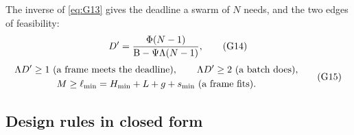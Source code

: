 \documentclass[11pt,a4paper]{article}
\newif\iffull
\begin{document}
\iffull
\textbf{Derivation of \eqref{eq:G10}--\eqref{eq:G13}.} \eqref{eq:G3} with $\nu=(N-1)\Lam/b$ gives
\eqref{eq:G10}. Dividing numerator and denominator by $\Psi$ gives \eqref{eq:G11}. At $b=1$,
$\Nmax(1)-1=\Ninf/(1+\beta)$, and the ratio is \eqref{eq:G12}; $\Gain<b$ because $b+\beta>1+\beta$
for $b>1$, and $\Gain<1+\beta$ because $b/(b+\beta)<1$. Inserting $b=\Lam\Dnet$ (ignoring the integer
rounding) in \eqref{eq:G10} gives \eqref{eq:G13}. For the channel, \eqref{eq:G9} is \eqref{eq:G3}
with $\Bud=\rhostar/\kappa$ and $\tauhat=\tauzero/\kappa-\delta$. \textit{Source:} derived in this
project.
\fi

The inverse of \eqref{eq:G13} gives the deadline a swarm of $N$ needs, and the two edges of
feasibility:
\begin{equation}
D'=\frac{\Phi(N-1)}{\mathrm{B}-\Psi\Lambda(N-1)}, \tag{G14}\label{eq:G14}
\end{equation}
\begin{equation}
\begin{gathered}
\Lam\Dnet\ge1\ \text{(a frame meets the deadline)},\qquad \Lam\Dnet\ge2\ \text{(a batch does)},\\
M\ge\ell_{\min}=H_{\min}+L+g+s_{\min}\ \text{(a frame fits)}.
\end{gathered} \tag{G15}\label{eq:G15}
\end{equation}

\subsection{Design rules in closed form}
\end{document}
